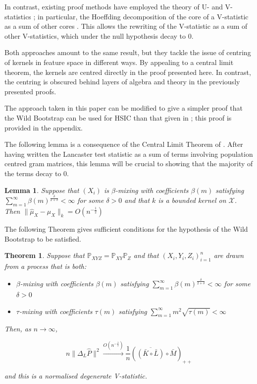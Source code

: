 \documentclass[]{article}
\newtheorem{lemma}{Lemma}
\newtheorem{theorem}{Theorem}
\begin{document}
In contrast, existing proof methods have employed the theory of U- and V-statistics \cite{chwialkowski2014kernel,chwialkowski2014wild}; in particular, the Hoeffding decomposition of the core of a V-statistic as a sum of other cores \cite{serfling2009approximation}. This allows the rewriting of the V-statistic as a sum of other V-statistics, which under the null hypothesis decay to 0.

Both approaches amount to the same result, but they tackle the issue of centring of kernels in feature space in different ways. By appealing to a central limit theorem, the kernels are centred directly in the proof presented here. In contrast, the centring is obscured behind layers of algebra and theory in the previously presented proofs.

The approach taken in this paper can be modified to give a simpler proof that the Wild Bootstrap can be used for HSIC than that given in \cite{chwialkowski2014wild}; this proof is provided in the appendix.

The following lemma is a consequence of the Central Limit Theorem of \cite{dehling2015bootstrap}. After having written the Lancaster test statistic as a sum of terms involving population centred gram matrices, this lemma will be crucial to showing that the majority of the terms decay to 0.

\begin{lemma}\label{lemma:hilbertCLT}
Suppose that $(X_i)$ is $\beta$-mixing with coefficients $\beta(m)$ satisfying $\sum_{m=1}^{\infty}\beta(m)^{\frac{\delta}{2+\delta}}<\infty$ for some $\delta > 0$ and that $k$ is a bounded kernel on $\mathcal{X}$. Then $\|\hat\mu_X - \mu_X\|_k = O(n^{-\frac{1}{2}})$

\end{lemma}

The following Theorem gives sufficient conditions for the hypothesis of the Wild Bootstrap to be satisfied.

\begin{theorem}\label{theorem:lancasterAsymptote}
Suppose that $\mathbb{P}_{XYZ} = \mathbb{P}_{XY}\mathbb{P}_Z$ and that $(X_i,Y_i,Z_i)_{i=1}^n$ are drawn from a process that is both:

\begin{itemize}
\item $\beta$-mixing with coefficients $\beta(m)$ satisfying $\sum_{m=1}^{\infty}\beta(m)^{\frac{\delta}{2+\delta}}<\infty$ for some $\delta>0$
\item $\tau$-mixing with coefficients $\tau(m)$ satisfying $\sum_{m=1}^\infty m^2 \sqrt{\tau(m)} < \infty$
\end{itemize}  Then, as $n\longrightarrow \infty$, 

\[ n\| \Delta_L\hat{P} \|^2 \xrightarrow{O(n^{-\frac{1}{2}})} \frac{1}{n}\left( \overline{\left( \bar{K} \circ \bar{L}\right) }\circ \bar{M} \right) _{++} \]

and this is a normalised degenerate V-statistic.
\end{theorem}
\end{document}
